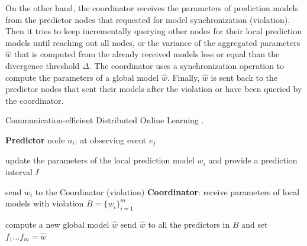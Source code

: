 \par On the other hand, the coordinator receives the parameters of prediction models from the predictor nodes that requested for model synchronization (violation). Then it tries to keep incrementally querying other nodes for their local prediction models until reaching out all nodes, or the variance of the aggregated parameters $\hat{w}$ that is computed from the already received models less or equal than the divergence threshold $\Delta$. The coordinator uses a synchronization operation to compute the parameters of a global model  $\hat{w}$. Finally, $\hat{w}$ is sent back to the predictor nodes that sent their models after the violation or have been queried by the coordinator. 

\begin{algorithm}[h]
	\caption{Communication-efficient Distributed Online Learning \cite{kamp2014communication}.} 
	\begin{algorithmic}[1] 
	
		\Statex \Indm  \textbf{Predictor} node $n_i$: at observing event $e_j$
		
		\Statex \Indp update the parameters of the local prediction model $w_i$ and provide a prediction interval $I$ \;
	 

		\Statex {}  
		\Statex send  $w_i$ to the Coordinator (violation) \;
		\Statex \Indm \textbf{Coordinator}:
		\Statex \Indp receive parameters of local models with violation 
		 $B=\{w_i\}_{i=1}^m$ \;
	
	
		\Statex {}
        \Statex
		\Statex compute a new global model $\hat{w}$ \;
		\Statex send $\hat{w}$ to all the predictors in $B$ and set $f_{1}\dots f_{m}=\hat{w} $\; 
		\Statex {}
	
	\end{algorithmic}
	\label{algonline:dol}
\end{algorithm}


